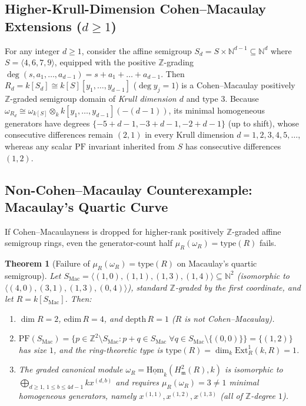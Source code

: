\documentclass[11pt]{article}
\newtheorem{theorem}{Theorem}[section]
\theoremstyle{definition}
\theoremstyle{remark}
\begin{document}
\subsection{Higher-Krull-Dimension Cohen--Macaulay Extensions ($d \ge 1$)}

For any integer $d \ge 1$, consider the affine semigroup $S_d = S \times \mathbb{N}^{d-1} \subseteq \mathbb{N}^d$ where $S = \langle 4, 6, 7, 9 \rangle$, equipped with the positive $\mathbb{Z}$-grading $\deg(s, a_1, \dots, a_{d-1}) = s + a_1 + \dots + a_{d-1}$. Then $R_d = k[S_d] \cong k[S][y_1, \dots, y_{d-1}]$ ($\deg y_j = 1$) is a Cohen--Macaulay positively $\mathbb{Z}$-graded semigroup domain of \emph{Krull dimension $d$} and type $3$. Because $\omega_{R_d} \cong \omega_{k[S]} \otimes_k k[y_1, \dots, y_{d-1}](-(d-1))$, its minimal homogeneous generators have degrees $\{-5 + d - 1, -3 + d - 1, -2 + d - 1\}$ (up to shift), whose consecutive differences remain $(2, 1)$ in every Krull dimension $d = 1, 2, 3, 4, 5, \dots$, whereas any scalar $\mathrm{PF}$ invariant inherited from $S$ has consecutive differences $(1, 2)$.

\subsection{Non-Cohen--Macaulay Counterexample: Macaulay's Quartic Curve}

If Cohen--Macaulayness is dropped for higher-rank positively $\mathbb{Z}$-graded affine semigroup rings, even the generator-count half $\mu_R(\omega_R) = \mathrm{type}(R)$ fails.

\begin{theorem}[Failure of $\mu_R(\omega_R) = \mathrm{type}(R)$ on Macaulay's quartic semigroup]\label{thm:macaulay}
Let $S_{\mathrm{Mac}} = \langle (1,0), (1,1), (1,3), (1,4) \rangle \subseteq \mathbb{N}^2$ (isomorphic to $\langle (4,0), (3,1), (1,3), (0,4) \rangle$), standard $\mathbb{Z}$-graded by the first coordinate, and let $R = k[S_{\mathrm{Mac}}]$. Then:
\begin{enumerate}
  \item[(a)] $\dim R = 2$, $\mathrm{edim}\, R = 4$, and $\mathrm{depth}\, R = 1$ ($R$ is not Cohen--Macaulay).
  \item[(b)] $\mathrm{PF}(S_{\mathrm{Mac}}) = \{ p \in \mathbb{Z}^2 \setminus S_{\mathrm{Mac}} : p + q \in S_{\mathrm{Mac}}\;\forall q \in S_{\mathrm{Mac}} \setminus \{(0,0)\} \} = \{(1, 2)\}$ has size $1$, and the ring-theoretic type is $\mathrm{type}(R) = \dim_k \mathrm{Ext}^1_R(k, R) = 1$.
  \item[(c)] The graded canonical module $\omega_R = \underline{\mathrm{Hom}}_k(H^2_{\mathfrak{m}}(R), k)$ is isomorphic to $\bigoplus_{d \ge 1,\, 1 \le b \le 4d - 1} k x^{(d, b)}$ and requires $\mu_R(\omega_R) = 3 \ne 1$ minimal homogeneous generators, namely $x^{(1,1)}, x^{(1,2)}, x^{(1,3)}$ (all of $\mathbb{Z}$-degree $1$).
\end{enumerate}
\end{theorem}
\end{document}
